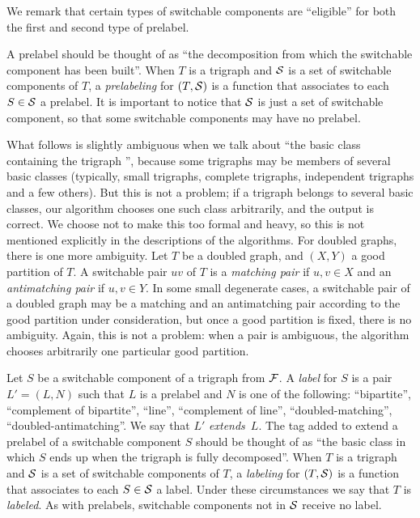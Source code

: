 \documentclass[11 pt] {article}
\begin{document}
We remark that certain types of switchable components are ``eligible''
for both the first and second type of prelabel.

A prelabel should be thought of as ``the decomposition from which the
switchable component has been built''.  When $T$ is a trigraph and
$\cal S$ is a set of switchable components of $T$, a
\emph{prelabeling} for $(T, {\cal S})$ is a function that associates
to each $S\in {\cal S}$ a prelabel.  It is important to notice that
$\cal S$ is just a set of switchable component, so that some
switchable components may have no prelabel. 

What follows is slightly ambiguous when we talk about ``the basic
class containing the trigraph '', because some trigraphs may be
members of several basic classes (typically, small trigraphs, complete
trigraphs, independent trigraphs and a few others).  But this is not a
problem; if a trigraph belongs to several basic classes, our algorithm
chooses one such class arbitrarily, and the output is correct.  We
choose not to make this too formal and heavy, so this is not mentioned
explicitly in the descriptions of the algorithms.  For doubled graphs,
there is one more ambiguity.  Let $T$ be a doubled graph, and $(X, Y)$
 a good partition of $T$.  A switchable pair $uv$ of $T$ is a
\emph{matching pair} if $u, v \in X$ and an \emph{antimatching pair}
if $u, v \in Y$.  In some small degenerate cases, a switchable pair of
a doubled graph may be a matching and an antimatching pair according
to the good partition under consideration, but once a good partition
is fixed, there is no ambiguity.  Again, this is not a problem: when a
pair is ambiguous, the algorithm chooses arbitrarily one particular
good partition.  


Let $S$ be a switchable component of a trigraph from $\cal F$.  A
\emph{label} for $S$ is a pair $L' = (L, N)$ such that $L$ is a
prelabel and $N$ is one of the following: ``bipartite'', ``complement
of bipartite'', ``line'', ``complement of line'',
``doubled-matching'', ``doubled-antimatching''.  We say that $L'$
\emph{extends}~$L$.  The tag added to extend a prelabel of a
switchable component $S$ should be thought of as ``the basic class in
which $S$ ends up when the trigraph is fully decomposed''.  When $T$
is a trigraph and $\cal S$ is a set of switchable components of $T$, a
\emph{labeling} for $(T, {\cal S})$ is a function that associates to
each $S\in {\cal S}$ a label.  Under these circumstances we say that
$T$ is {\em labeled}.  As with prelabels, switchable components not in
$\cal S$ receive no label. 
\end{document}
